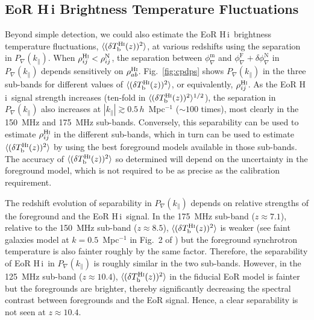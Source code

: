 \documentclass[
reprint,
superscriptaddress,
amsmath,
amssymb,
aps,
prd
]{revtex4-1}
\newcommand{\HI}{H\,{\sc i}}
\begin{document}
\begin{figure}[htb]
\end{figure}

\subsection{EoR H\,{\sc i} Brightness Temperature Fluctuations} \label{sec:Tb-variance}

Beyond simple detection, we could also estimate the EoR \HI\ brightness temperature fluctuations, $\langle(\delta T_\textrm{b}^\textrm{H{\sc i}}(z))^2\rangle$, at various redshifts using the separation in $P_\nabla(k_\parallel)$. When $\rho_{ij}^\textrm{H{\sc i}} < \rho_{ij}^\textrm{N}$, the separation between $\phi_\nabla^\textrm{m}$ and $\phi_\nabla^\textrm{F} + \delta\phi_\nabla^\textrm{N}$ in $P_\nabla(k_\parallel)$ depends sensitively on $\rho_{ab}^\textrm{H{\sc i}}$. Fig.~\ref{fig:cpdps} shows $P_\nabla(k_\parallel)$ in the three sub-bands for different values of $\langle(\delta T_\textrm{b}^\textrm{H{\sc i}}(z))^2\rangle$, or equivalently, $\rho_{ij}^\textrm{H{\sc i}}$. As the EoR \HI\ signal strength increases (ten-fold in $\langle(\delta T_\textrm{b}^\textrm{H{\sc i}}(z))^2\rangle^{1/2}$), the separation in $P_\nabla(k_\parallel)$ also increases at $|k_\parallel| \gtrsim 0.5\,h$~Mpc$^{-1}$ ($\sim 100$ times), most clearly in the 150~MHz and 175~MHz sub-bands. Conversely, this separability can be used to estimate $\rho_{ij}^\textrm{H{\sc i}}$ in the different sub-bands, which in turn can be used to estimate $\langle(\delta T_\textrm{b}^\textrm{H{\sc i}}(z))^2\rangle$ by using the best foreground models available in those sub-bands. The accuracy of $\langle(\delta T_\textrm{b}^\textrm{H{\sc i}}(z))^2\rangle$ so determined will depend on the uncertainty in the foreground model, which is not required to be as precise as the calibration requirement.

The redshift evolution of separability in $P_\nabla(k_\parallel)$ depends on relative strengths of the foreground and the EoR \HI\ signal. In the 175~MHz sub-band ($z\approx 7.1$), relative to the 150~MHz sub-band ($z\approx 8.5$), $\langle(\delta T_\textrm{b}^\textrm{H{\sc i}}(z))^2\rangle$ is weaker (see {\sc faint galaxies} model at $k=0.5$~Mpc$^{-1}$ in Fig.~2 of \cite{gre17b}) but the foreground synchrotron temperature is also fainter roughly by the same factor. Therefore, the separability of EoR \HI\ in $P_\nabla(k_\parallel)$ is roughly similar in the two sub-bands. However, in the 125~MHz sub-band ($z\approx 10.4$), $\langle(\delta T_\textrm{b}^\textrm{H{\sc i}}(z))^2\rangle$ in the fiducial EoR model is fainter but the foregrounds are brighter, thereby significantly decreasing the spectral contrast between foregrounds and the EoR signal. Hence, a clear separability is not seen at $z\approx 10.4$.
\end{document}
